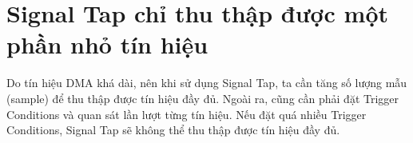 \section{Signal Tap chỉ thu thập được một phần nhỏ tín hiệu}

Do tín hiệu DMA khá dài, nên khi sử dụng Signal Tap, ta cần tăng số lượng mẫu (sample) để thu thập được tín hiệu đầy đủ. Ngoài ra, cũng cần phải đặt Trigger Conditions và quan sát lần lượt từng tín hiệu. Nếu đặt quá nhiều Trigger Conditions, Signal Tap sẽ không thể thu thập được tín hiệu đầy đủ.